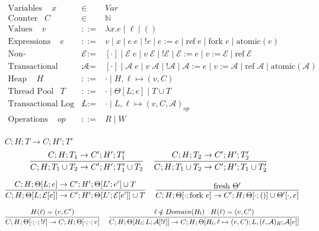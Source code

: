\documentclass[9pt]{article}
\newcommand{\aeval}[1]{\mathcal{A}[#1]}
\newcommand{\actxt}[0]{\mathcal{A}}
\newcommand{\eval}[1]{\mathcal{E}[#1]}
\newcommand{\ctxt}[0]{\mathcal{E}}
\newcommand{\loc}[0]{\ell}
\newcommand{\atomic}[1]{\text{atomic}(#1)}
\newcommand{\alloc}[1]{\text{ref} \; #1}
\newcommand{\fork}[1]{\text{fork } #1}
\begin{document}
\begingroup\makeatletter{}\check@mathfonts


\begin{displaymath}
\begin{array}{rcll}
\text{Variables } \;\;\; x &\in& Var \\
\text{Counter} \;\;\; C &\in& \mathbb{N} \\
\text{Values } \;\;\; v &::=& \lambda x. e \; | \; \loc \; | \; () \\
\text{Expressions } \;\;\; e &::=& v \; | \; x \; | \; e \; e \; | \; !e \; | \; e := e \; | \; \alloc{e} \; | \; \fork{e} \; | \; \atomic{e}\\
\text{Non-Transactional Context } \;\;\; \ctxt &::=& [\cdot] \; | \; \ctxt \; e \; | \; v \; \ctxt \; | \; ! \ctxt \; | \; \ctxt := e \; | \; v := \ctxt \; | \; \alloc{\ctxt} \\
\text{Transactional Context } \;\;\; \actxt &::=& [\cdot] \; | \; \actxt \; e \; | \; v \; \actxt \; | \; ! \actxt \; | \; \actxt := e \; | \; v := \actxt \; | \; \alloc{\actxt} \; | \; \atomic{\actxt} \\
\text{Heap } \;\;\; H &::=& \cdot \; | \; H, \loc \mapsto (v, C) \\
\text{Thread Pool} \;\;\; T &::=& \cdot \; | \; \Theta[L; e] \; | \; T \cup T \\
\text{Transactional Log } \;\;\; L &::=& \cdot \; | \; L, \loc \mapsto (v, C, \actxt)_{op}  \\
\text{Operations } \;\;\; op &::=& R \; | \; W \\
\end{array}
\end{displaymath}

$\boxed{C; H; T \rightarrow C; H' ;T'}$
\[%
\infer[]{C; H; T_1 \cup T_2 \rightarrow C'; H'; T_1' \cup T_2}{C; H; T_1 \rightarrow C'; H'; T_1'} \;\;\;
\infer[]{C; H; T_1 \cup T_2 \rightarrow C'; H'; T_1 \cup T_2'}{C; H; T_2 \rightarrow C'; H'; T_2'} \;\;\; 
\]

\[%
\infer[]{C; H; \Theta[L; \eval{e}] \rightarrow C'; H'; \Theta[L'; \eval{e'}] \cup T}{C; H; \Theta[L; e] \rightarrow C'; H'; \Theta[L'; e'] \cup T} \;\;\;
\infer[]{C; H; \Theta[\cdot; \fork{e}] \rightarrow C'; H; \Theta[\cdot; ()] \cup \Theta'[\cdot, e]}{\text{fresh } \Theta'}
\]

\[%
\infer[]{C; H; \Theta[\cdot; \cdot; !\loc] \rightarrow C; H; \Theta[\cdot; \cdot; v]}{H(\loc) = (v, C')} \;\;\;
\infer[]{C; H; \Theta[H_l; L; \aeval{!\loc}] \rightarrow C; H; \Theta[H_l, \loc \mapsto (v, C); L, (\loc, \actxt)_R; \aeval{v}]}{\loc \notin Domain(H_l) \;\;\; H(\loc) = (v, C') } 
\]
\end{document}
